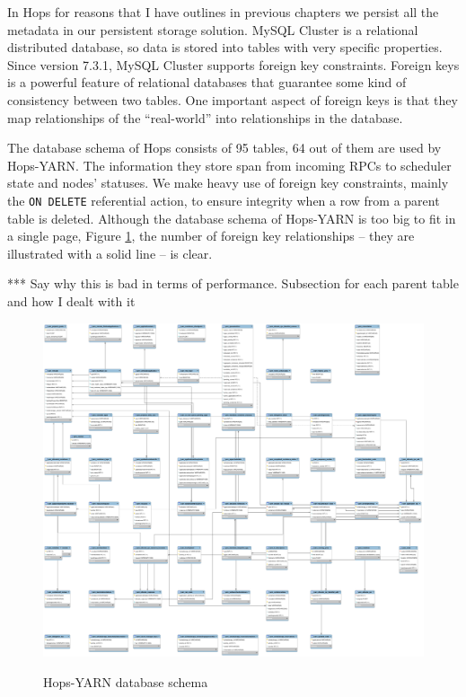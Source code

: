In Hops for reasons that I have outlines in previous chapters we
persist all the metadata in our persistent storage solution. MySQL
Cluster is a relational distributed database, so data is stored into
tables with very specific properties. Since version 7.3.1, MySQL
Cluster supports foreign key constraints. Foreign keys is a powerful
feature of relational databases that guarantee some kind of
consistency between two tables. One important aspect of foreign keys
is that they map relationships of the ``real-world'' into
relationships in the database.

The database schema of Hops consists of 95 tables, 64 out of them are
used by Hops-YARN. The information they store span from incoming RPCs
to scheduler state and nodes' statuses. We make heavy use of foreign
key constraints, mainly the \texttt{ON DELETE} referential action, to
ensure integrity when a row from a parent table is deleted. Although
the database schema of Hops-YARN is too big to fit in
a single page, Figure \ref{fig:impl_fk_yarn_schema}, the number of
foreign key relationships -- they are illustrated with a solid line --
is clear.

*** Say why this is bad in terms of performance. Subsection for each
parent table and how I dealt with it

\begin{figure}
\centering
\includegraphics[scale=0.2, angle=90]{resources/images/Implementation/hops_yarn_ndb_schema_full.png}
\label{fig:impl_fk_yarn_schema}
\caption{Hops-YARN database schema}
\end{figure}